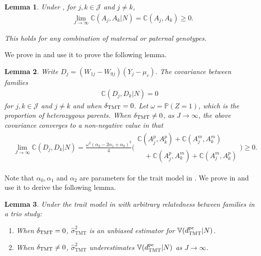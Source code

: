 \documentclass[12pt]{extarticle}
\newtheorem{lem}{Lemma}%
\newcommand{\pp}{\mathbb{P}}
\newcommand{\nind}{J}
\newcommand{\tmt}{{\normalfont \text{TMT}}}
\newcommand{\dtmtpc}{d_{\tmt}^{\normalfont \text{pc}}}
\newcommand{\vtmthat}{\hat{\sigma}^2_{\text{TMT}}}
\newcommand{\V}{\mathbb{V}}
\newcommand{\cV}{\mathbb{C}}
\newcommand{\cJ}{\mathcal{J}}
\begin{document}
{\begin{lem} \label{lem:cov_g_convergence}
Under , for $j, k \in \cJ$ and $j \not= k$,
\begin{align*}
& \lim_{\nind \to \infty} \cV(A_j,A_k|N) = \cV(A_j,A_k) \geq 0.
\end{align*}

\noindent This holds for any combination of maternal or paternal genotypes.
\end{lem} 

\noindent We prove  in  and use it to prove the following lemma.

\begin{lem}\label{lem:vir_cov}
Write $D_j=(W_{1j}-W_{0j})(Y_j-\mu_c).$ The covariance between families 
\begin{align*}
\cV(D_j,D_k|N)=0
\end{align*} for $j,k\in \cJ$ and $j \not= k$ and when $\delta_{\tmt} = 0$. Let $\omega=\pp(Z=1)$, which is the proportion of heterozygous parents. When $\delta_{\tmt} \not= 0$, as $\nind \to \infty$, the above covariance converges to a non-negative value in that 
\begin{align*}
& \lim_{\nind \to \infty} \cV(D_j,D_k|N) = \frac{\omega^2(\alpha_2-2\alpha_1+\alpha_0)^2}{4}\Big(\begin{array}{l}
  \cV(A^p_j,A^p_k) + \cV(A^m_j,A^m_k) \\
  \quad + \cV(A^p_j,A^m_k) + \cV(A^m_j,A^p_k)
\end{array}\Big)\geq 0.
\end{align*}
\end{lem}

\noindent Note that $\alpha_0,\alpha_1$ and $\alpha_2$ are parameters for the trait model in . We prove  in  and use it to derive the following lemma. 

\begin{lem}\label{lem:vir_all}
Under the trait model in  with arbitrary relatedness between families in a trio study: \begin{enumerate}
\item[(A)] When $\delta_{\tmt} = 0$, {\normalfont $\vtmthat$} is an unbiased estimator for {\normalfont $\V(\dtmtpc|N)$}. 
\item[(B)] When $\delta_{\tmt} \not= 0$, {\normalfont $\vtmthat$} underestimates {\normalfont $\V(\dtmtpc|N)$} as $\nind \to \infty$. \end{enumerate}
\end{lem}

}
\end{document}
